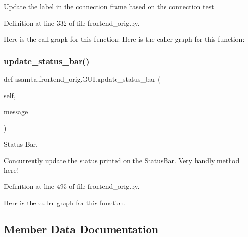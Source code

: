 \begin{DoxyVerb}Update the label in the connection frame based on the connection test \end{DoxyVerb}
 

Definition at line 332 of file frontend\+\_\+orig.\+py.

Here is the call graph for this function\+:
Here is the caller graph for this function\+:
\mbox{\label{classasamba_1_1frontend__orig_1_1_g_u_i_a630301b7e934776f232fcb4562974ae9}} 
\subsubsection{\texorpdfstring{update\+\_\+status\+\_\+bar()}{update\_status\_bar()}}
{\footnotesize\ttfamily def asamba.\+frontend\+\_\+orig.\+G\+U\+I.\+update\+\_\+status\+\_\+bar (\begin{DoxyParamCaption}\item[{}]{self,  }\item[{}]{message }\end{DoxyParamCaption})}



Status Bar. 

\begin{DoxyVerb}Concurrently update the status printed on the StatusBar. Very handly method here! \end{DoxyVerb}
 

Definition at line 493 of file frontend\+\_\+orig.\+py.

Here is the caller graph for this function\+:


\subsection{Member Data Documentation}
\mbox{\label{classasamba_1_1frontend__orig_1_1_g_u_i_a8ffe858f422b6affa1bc05765e05f360}} 

